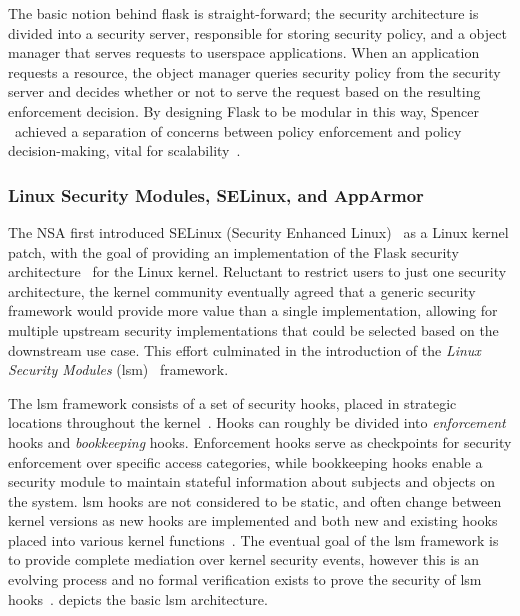 The basic notion behind flask is straight-forward; the security architecture is divided
into a security server, responsible for storing security policy, and a object manager that
serves requests to userspace applications. When an application requests a resource, the
object manager queries security policy from the security server and decides whether or not
to serve the request based on the resulting enforcement decision. By designing Flask to be
modular in this way, Spencer \etal~achieved a separation of concerns between policy
enforcement and policy decision-making, vital for scalability~\cite{spencer1999_flask,
smalley2001_selinux, loscocco2001_selinux}.

\subsubsection*{Linux Security Modules, SELinux, and AppArmor}

The NSA first introduced SELinux (Security Enhanced Linux)~\cite{smalley2001_selinux,
loscocco2001_selinux} as a Linux kernel patch, with the goal of providing an
implementation of the Flask security architecture~\cite{spencer1999_flask} for the Linux
kernel. Reluctant to restrict users to just one security architecture, the kernel
community eventually agreed that a generic security framework would provide more value
than a single implementation, allowing for multiple upstream security implementations that
could be selected based on the downstream use case. This effort culminated in the
introduction of the \textit{Linux Security Modules} (\gls{lsm})~\cite{wright2002_lsm} framework.

The \gls{lsm} framework consists of a set of security hooks, placed in strategic locations
throughout the kernel~\cite{wright2002_lsm}. Hooks can roughly be divided into
\textit{enforcement} hooks and \textit{bookkeeping} hooks. Enforcement hooks serve as
checkpoints for security enforcement over specific access categories, while bookkeeping
hooks enable a security module to maintain stateful information about subjects and objects
on the system.  \gls{lsm} hooks are not considered to be static, and often change between
kernel versions as new hooks are implemented and both new and existing hooks placed into
various kernel functions~\cite{zhang2021_lsm_file_overhead}. The eventual goal of the
\gls{lsm} framework is to provide complete mediation over kernel security events, however
this is an evolving process and no formal verification exists to prove the security of
\gls{lsm} hooks~\cite{ganapathy2005_lsm}.  depicts the basic \gls{lsm} architecture.

